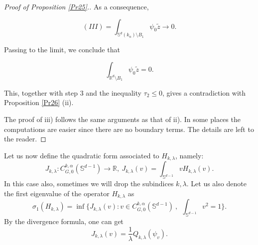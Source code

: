 \documentclass[reqno]{amsart}
\def\R{\mathbb R}
\numberwithin{equation}{section}
\newenvironment{key words}{\textbf{Keywords}\mbox{  }}{ }
\begin{document}
\begin{proof}[Proof of Proposition \ref{Pr25}.]
As a consequence,

$$(III) = \int_{\mathbb{S}^{d}(k_{n})\setminus B_{1}}   \psi_{0}\tilde{z}  \to 0.$$

Passing to the limit, we conclude that

$$ \int_{\mathbb{R}^{d}\setminus B_{1}}   \psi_{0}\tilde{z} =0.$$


This, together with step 3 and the inequality $\tau_2 \leq 0$, gives a contradiction with Proposition \ref{Pr26} (ii).


\bigskip The proof of iii) follows the same arguments as that of ii). In some places the computations are easier since there are no boundary terms. The details are left to the reader.

\end{proof}

Let us now define the quadratic form associated to $H_{k,\lambda}$, namely:
\[ {J_{k,\lambda}: C^{k,\alpha}_{G,0}(\mathbb{S}^{d-1}) \to \R, \ J_{k,\lambda} (v) = \int_{\mathbb{S}^{d-1}}v H_{k, \lambda}(v). }\]
In this case also, sometimes we will drop the subindices $k,\lambda$.
Let us also denote the first eigenvalue of the operator $H_{k, \lambda}$ as
 \[\sigma_{1}(H_{k, \lambda})=\inf\Bigg\{J_{k,\lambda}(v ): v\in C^{k,\alpha}_{G,0}(\mathbb{S}^{d-1})~,~~\int_{\mathbb{S}^{d-1}}v^{2}=1\Bigg\}.\]
By the divergence formula, one can get
\[J_{k,\lambda} (v)=\frac{1}{\lambda}Q_{k, \lambda}(\psi_{v}).\]

\medskip
\end{document}
